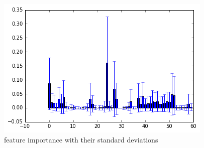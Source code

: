 \documentclass[sigconf]{acmart}
\begin{document}
\begin{figure}
    \centering
    \includegraphics[width=1.0\columnwidth]{images/output_17_0.png}
    \caption{feature importance with their standard deviations}
    \label{Featites Format}
\end{figure}
\end{document}
